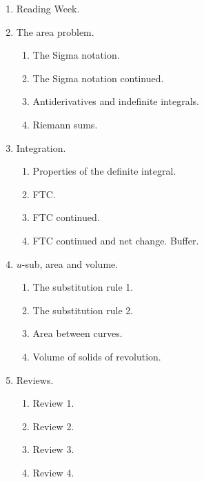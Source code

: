 \documentclass[../main.tex]{subfiles}
\begin{document}
\begin{multicols}{2}
\begin{enumerate}[wide, label={\textbf{Week \arabic*}.}]
    \item Reading Week.

    \item The area problem.
      \begin{enumerate}[resume]
        \item The Sigma notation.
        \item The Sigma notation continued.
        \item Antiderivatives and indefinite integrals.
        \item Riemann sums.
      \end{enumerate}

    \item Integration.
      \begin{enumerate}[resume]
        \item Properties of the definite integral.
        \item FTC.
        \item FTC continued.
        \item FTC continued and net change. Buffer.
      \end{enumerate}

    \item \(u\)-sub, area and volume.
      \begin{enumerate}[resume]
        \item The substitution rule 1.
        \item The substitution rule 2.
        \item Area between curves.
        \item Volume of solids of revolution.
      \end{enumerate}

    \item Reviews.
      \begin{enumerate}[resume]
        \item Review 1.
        \item Review 2.
        \item Review 3.
        \item Review 4.
      \end{enumerate}
  \end{enumerate}
\end{multicols}
\clearpage
\end{document}
